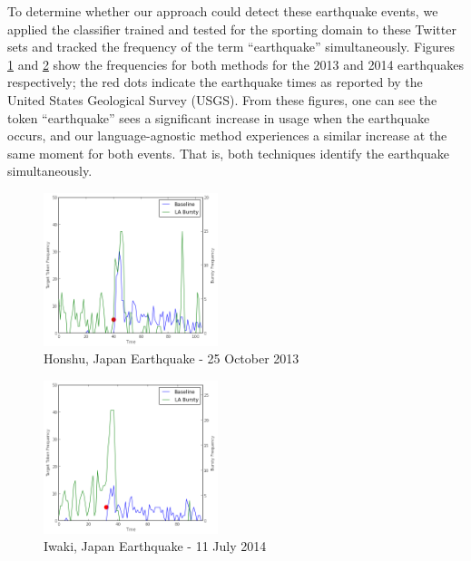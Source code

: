 \documentclass{sig-alternate}
\begin{document}
To determine whether our approach could detect these earthquake events, we applied the classifier trained and tested for the sporting domain to these Twitter sets and tracked the frequency of the term ``earthquake'' simultaneously.
Figures \ref{fig:2013Japan} and \ref{fig:2014Japan} show the frequencies for both methods for the 2013 and 2014 earthquakes respectively; the red dots indicate the earthquake times as reported by the United States Geological Survey (USGS).
From these figures, one can see the token ``earthquake'' sees a significant increase in usage when the earthquake occurs, and our language-agnostic method experiences a similar increase at the same moment for both events.
That is, both techniques identify the earthquake simultaneously.

\begin{figure}[hbt]
\begin{center}
\includegraphics[width=2in]{./figures/2013-japan-quake.png}
\caption{Honshu, Japan Earthquake - 25 October 2013}
\label{fig:2013Japan}
\end{center}
\end{figure}

\begin{figure}[hbtp]
\begin{center}
\includegraphics[width=2in]{./figures/2014-japan-quake.png}
\caption{Iwaki, Japan Earthquake - 11 July 2014}
\label{fig:2014Japan}
\end{center}
\end{figure}
\end{document}
